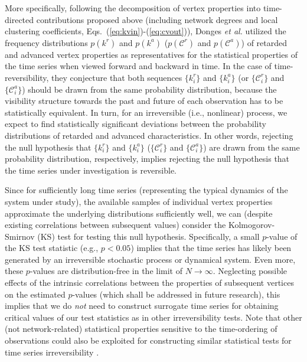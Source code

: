 		More specifically, following the decomposition of vertex properties into time-directed contributions proposed above (including network degrees and local clustering coefficients, Eqs.~(\ref{eq:kvin})-(\ref{eq:cvout})), Donges {\textit{et al.}} \cite{Donges2013} utilized the frequency distributions {$p(k^{r})$ and $p(k^{a})$ ($p(\mathcal{C}^{r})$ and $p(\mathcal{C}^{a})$)} of retarded and advanced {vertex properties} as representatives for the statistical properties of the time series when viewed forward and backward in time. In the case of time-reversibility, they conjecture that both sequences {$\{k_i^{r}\}$ and $\{k_i^{a}\}$} (or {$\{\mathcal{C}_i^{r}\}$ and $\{\mathcal{C}_i^{a}\}$}) should be drawn from the same probability distribution, because the visibility structure towards the past and future of each observation has to be statistically equivalent. In turn, for an irreversible (i.e., nonlinear) process, we expect to find statistically significant deviations between the probability distributions of retarded and advanced characteristics. In other words, rejecting the null hypothesis that {$\{k_i^{r}\}$ and $\{k_i^{a}\}$} ({$\{\mathcal{C}_i^{r}\}$ and $\{\mathcal{C}_i^{a}\}$}) are drawn from the same probability distribution, respectively, implies rejecting the null hypothesis that the time series under investigation is reversible. 
		
		{Since for sufficiently long time series (representing the typical dynamics of the system under study), the available samples of individual vertex properties approximate the underlying distributions sufficiently well, we can (despite existing correlations between subsequent values)} consider the Kolmogorov-Smirnov (KS) test for testing this null hypothesis. {Specifically}, a small $p$-value of the KS test statistic (e.g., $p<0.05$) implies that the time series has likely been generated by an irreversible stochastic process or dynamical system. Even more, these $p$-values are distribution-free in the limit of $N\to\infty$. {Neglecting possible effects of the intrinsic correlations between the properties of subsequent vertices on the estimated $p$-values (which shall be addressed in future research), this} implies that we do \textit{not} need to construct surrogate time series for obtaining critical values of our test statistics as in other {ir}reversibility tests. Note that other (not network-related) statistical properties sensitive to the time-ordering of observations could also be exploited for constructing similar statistical tests for time series irreversibility \cite{Donges2013}. 
		
